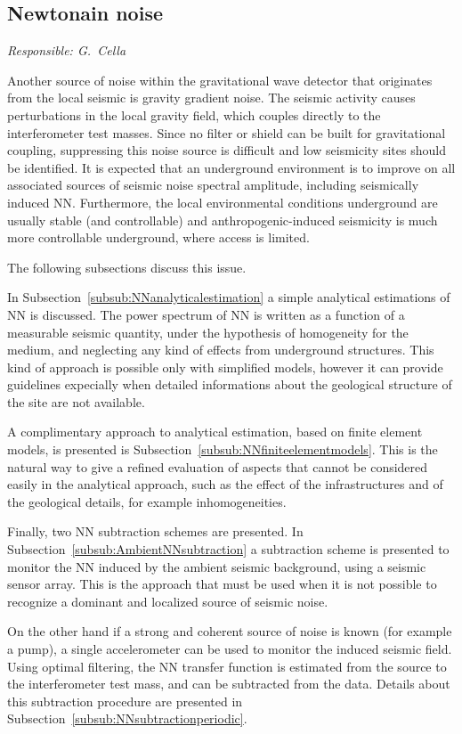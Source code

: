 \FloatBarrier
\subsection{Newtonain noise}
\emph{
Responsible:  G.\ Cella  \\
}

Another source of noise within the gravitational wave detector that originates
from the local seismic is gravity gradient noise. The seismic activity causes
perturbations in the local gravity field, which couples directly to the
interferometer test masses. Since no filter or shield can be built for
gravitational coupling, suppressing this noise source is difficult and low
seismicity sites should be identified. It is expected that an underground
environment is to improve on all associated sources of seismic noise spectral
amplitude, including seismically induced NN. Furthermore, the local
environmental conditions underground are usually stable (and controllable) and
anthropogenic-induced seismicity is much more controllable underground, where
access is limited.

The following subsections discuss this issue. 

In Subsection~\ref{subsub:NNanalyticalestimation} a simple analytical
estimations of NN is discussed. The power spectrum of NN is written as a
function of a measurable seismic quantity, under the hypothesis of homogeneity
for the medium, and neglecting any kind of effects from underground
structures.  This kind of approach is possible only with simplified models,
however it can provide guidelines expecially when detailed informations about
the geological structure of the site are not available.

A complimentary approach to analytical estimation, based on finite element
models, is presented is Subsection~\ref{subsub:NNfiniteelementmodels}. This is
the natural way to give a refined evaluation of aspects that cannot be
considered easily in the analytical approach, such as the effect of the
infrastructures and of the geological details, for example inhomogeneities.

Finally, two NN subtraction schemes are presented. In
Subsection~\ref{subsub:AmbientNNsubtraction} a subtraction scheme is presented
to monitor the NN induced by the ambient seismic background, using a seismic
sensor array. This is the approach that must be used when it is not possible
to recognize a dominant and localized source of seismic noise.

On the other hand if a strong and coherent source of noise is known (for
example a pump), a single accelerometer can be used to monitor the induced
seismic field. Using optimal filtering, the NN transfer function is estimated
from the source to the interferometer test mass, and can be subtracted from
the data. Details about this subtraction procedure are presented in
Subsection~\ref{subsub:NNsubtractionperiodic}.
\FloatBarrier
